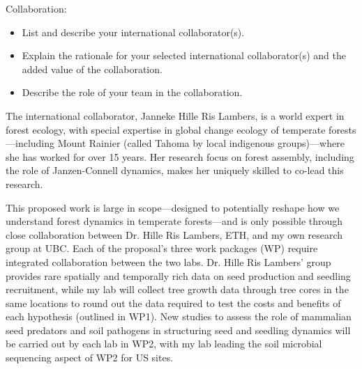 \documentclass[12pt,oneside]{article}
\newenvironment{smitemize}{
\begin{itemize}
  \setlength{\itemsep}{1pt}
  \setlength{\parskip}{0pt}
  \setlength{\parsep}{0pt}}
{\end{itemize}
}
\begin{document}
{\sc Collaboration:} %
\vspace{-1ex}
\begin{smitemize}
\item List and describe your international collaborator(s).
\item Explain the rationale for your selected international collaborator(s) and the added value of the collaboration.
\item Describe the role of your team in the collaboration.
\end{smitemize}
The international collaborator, Janneke Hille Ris Lambers, is a world expert in forest ecology,\cite{clark1999seed,hille2005implications,ettinger2013climate,hillerislambers2013will,ford2017competition,buckley2019temperate,ford2020soil} with special expertise in global change ecology of temperate forests---including Mount Rainier (called Tahoma by local indigenous groups)---where she has worked for over 15 years.\cite{ettinger2011climate,anderegg2016drought,ford2017competition,ford2020soil} Her research focus on forest assembly, including the role of Janzen-Connell dynamics,\cite{hille2002density} makes her uniquely skilled to co-lead this research. %

This proposed work is large in scope---designed to potentially reshape how we understand forest dynamics in temperate forests---and is only possible through close collaboration between Dr. Hille Ris Lambers, ETH, and my own research group at UBC. Each of the proposal's three work packages (WP) require integrated collaboration between the two labs. Dr. Hille Ris Lambers' group provides rare spatially and temporally rich data on seed production and seedling recruitment, while my lab will collect tree growth data through tree cores in the same locations to round out the data required to test the costs and benefits of each hypothesis (outlined in WP1). New studies to assess the role of mammalian seed predators and soil pathogens in structuring seed and seedling dynamics will be carried out by each lab in WP2, with my lab leading the soil microbial sequencing aspect of WP2 for US sites. 
\end{document}
